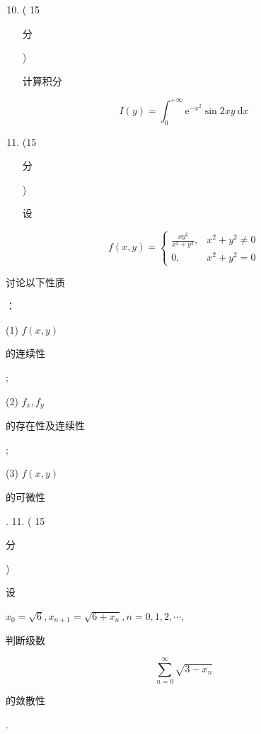 \documentclass[10pt]{article}
\begin{document}
\begin{enumerate}
  \setcounter{enumi}{9}
  \item ( 15 \begin{CJK}{UTF8}{mj}分\end{CJK}) \begin{CJK}{UTF8}{mj}计算积分\end{CJK}
\end{enumerate}
$$
I(y)=\int_{0}^{+\infty} \mathrm{e}^{-x^{2}} \sin 2 x y \mathrm{~d} x
$$

\begin{enumerate}
  \setcounter{enumi}{10}
  \item (15 \begin{CJK}{UTF8}{mj}分\end{CJK}) \begin{CJK}{UTF8}{mj}设\end{CJK}
\end{enumerate}
$$
f(x, y)= \begin{cases}\frac{x y^{2}}{x^{2}+y^{2}}, & x^{2}+y^{2} \neq 0 \\ 0, & x^{2}+y^{2}=0\end{cases}
$$
\begin{CJK}{UTF8}{mj}讨论以下性质\end{CJK}：

(1) $f(x, y)$ \begin{CJK}{UTF8}{mj}的连续性\end{CJK};

(2) $f_{x}, f_{y}$ \begin{CJK}{UTF8}{mj}的存在性及连续性\end{CJK};

(3) $f(x, y)$ \begin{CJK}{UTF8}{mj}的可微性\end{CJK}. 11. ( 15 \begin{CJK}{UTF8}{mj}分\end{CJK}) \begin{CJK}{UTF8}{mj}设\end{CJK} $x_{0}=\sqrt{6}, x_{n+1}=\sqrt{6+x_{n}}, n=0,1,2, \cdots$, \begin{CJK}{UTF8}{mj}判断级数\end{CJK}
$$
\sum_{n=0}^{\infty} \sqrt{3-x_{n}}
$$
\begin{CJK}{UTF8}{mj}的敛散性\end{CJK}.
\end{document}
